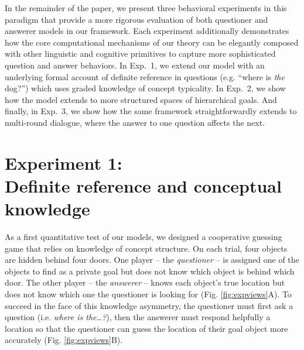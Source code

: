 \documentclass[11pt, floatsintext]{apa6}
\begin{document}

In the remainder of the paper, we present three behavioral experiments in this paradigm that provide a more rigorous evaluation of both questioner and answerer models in our framework.
Each experiment additionally demonstrates how the core computational mechanisms of our theory can be elegantly composed with other linguistic and cognitive primitives to capture more sophisticated question and answer behaviors.
In Exp.~1, we extend our model with an underlying formal account of definite reference in questions (e.g. ``where is \emph{the} dog?'') which uses graded knowledge of concept typicality.
In Exp.~2, we show how the model extends to more structured spaces of hierarchical goals.
And finally, in Exp.~3, we show how the same framework straightforwardly extends to multi-round dialogue, where the answer to one question affects the next.

\section{Experiment 1: \\ Definite reference and conceptual knowledge}

As a first quantitative test of our models, we designed a cooperative guessing game that relies on knowledge of concept structure. 
On each trial, four objects are hidden behind four doors.
One player -- the \emph{questioner} -- is assigned one of the objects to find as a private goal but does not know which object is behind which door.
The other player -- the \emph{answerer} -- knows each object's true location but does not know which one the questioner is looking for (Fig. \ref{fig:expviews}A). 
To succeed in the face of this knowledge asymmetry, the questioner must first ask a question (i.e. \emph{where is the\dots?}), then the answerer must respond helpfully a location so that the questioner can guess the location of their goal object more accurately (Fig. \ref{fig:expviews}B).
\end{document}
